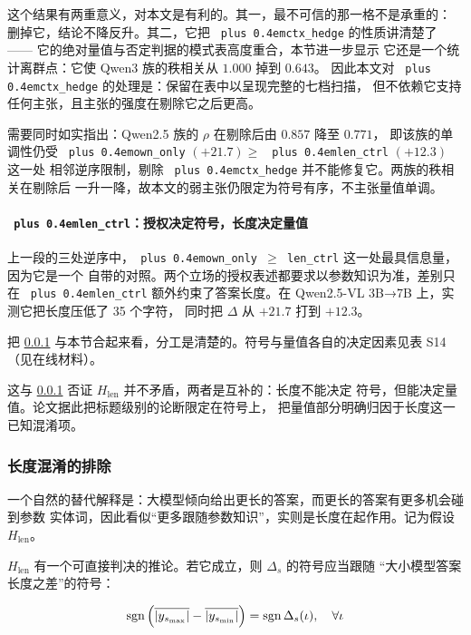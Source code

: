 \documentclass[10.5pt,compsoc,UTF8]{CjC}
\theoremstyle{mystyle}
\DeclareRobustCommand{\code}[1]{\texttt{\spaceskip=0pt plus 0.4em\relax#1}}
\begin{document}
这个结果有两重意义，对本文是有利的。其一，最不可信的那一格不是承重的：
删掉它，结论不降反升。其二，它把 \code{ctx\_hedge} 的性质讲清楚了 ——
它的绝对量值与否定判据的模式表高度重合，本节进一步显示
它还是一个统计离群点：它使 Qwen3 族的秩相关从 $1.000$ 掉到 $0.643$。
因此本文对 \code{ctx\_hedge} 的处理是：保留在表中以呈现完整的七档扫描，
但不依赖它支持任何主张，且主张的强度在剔除它之后更高。

需要同时如实指出：Qwen2.5 族的 $\rho$ 在剔除后由 $0.857$ 降至 $0.771$，
即该族的单调性仍受 \code{own\_only} $(+21.7) \ge$ \code{len\_ctrl} $(+12.3)$ 这一处
相邻逆序限制，剔除 \code{ctx\_hedge} 并不能修复它。两族的秩相关在剔除后
一升一降，故本文的弱主张仍限定为符号有序，不主张量值单调。

\paragraph{\code{len\_ctrl}：授权决定符号，长度决定量值}
\label{sec:4-2-3-5}

上一段的三处逆序中，\code{own\_only $\geq$ len\_ctrl} 这一处最具信息量，因为它是一个
自带的对照。两个立场的授权表述都要求以参数知识为准，差别只在 \code{len\_ctrl}
额外约束了答案长度。在 Qwen2.5-VL 3B→7B 上，实测它把长度压低了 35 个字符，
同时把 $\Delta$ 从 $+21.7$ 打到 $+12.3$。

把 \ref{sec:4-2-4} 与本节合起来看，分工是清楚的。符号与量值各自的决定因素见表 S14（见在线材料）。

这与 \ref{sec:4-2-4} 否证 $H_{\text{len}}$ 并不矛盾，两者是互补的：长度不能决定
符号，但能决定量值。论文据此把标题级别的论断限定在符号上，
把量值部分明确归因于长度这一已知混淆项。

\subsubsection{长度混淆的排除}
\label{sec:4-2-4}

一个自然的替代解释是：大模型倾向给出更长的答案，而更长的答案有更多机会碰到参数
实体词，因此看似“更多跟随参数知识”，实则是长度在起作用。记为假设 $H_{\text{len}}$。

$H_{\text{len}}$ 有一个可直接判决的推论。若它成立，则 $\Delta_s$ 的符号应当跟随
“大小模型答案长度之差”的符号：

\begin{equation*}
  \resizebox{\ifdim\width>\linewidth \linewidth\else\width\fi}{!}{$\displaystyle \text{sgn}\left(\overline{|y_{s_{\max}}|} - \overline{|y_{s_{\min}}|}\right) =\allowbreak{} \text{sgn}\,\Delta_s(\iota),\allowbreak{} \quad \forall \iota$}
\end{equation*}
\end{document}
